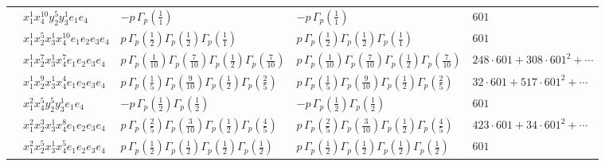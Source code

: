 \documentclass[11pt]{article}
\begin{document}
\begin{table}[ht]
{\begin{tabular}{@{}lllll@{}}
 & $x_{1}^{1} x_{4}^{10} y_{2}^{5} y_{3}^{1} e_{1} e_{4}$ & $- p \, \Gamma_p \left( \frac{1}{1} \right)$ & $- p \, \Gamma_p \left( \frac{1}{1} \right)$ & $601$ \\
 & $x_{1}^{1} x_{2}^{5} x_{3}^{1} x_{4}^{10}  e_{1} e_{2} e_{3} e_{4}$ & $p \, \Gamma_p \left( \frac{1}{2} \right) \Gamma_p \left( \frac{1}{2} \right) \Gamma_p \left( \frac{1}{1} \right)$ & $p \, \Gamma_p \left( \frac{1}{2} \right) \Gamma_p \left( \frac{1}{2} \right) \Gamma_p \left( \frac{1}{1} \right)$ & $601$ \\
 & $x_{1}^{1} x_{2}^{7} x_{3}^{1} x_{4}^{7}  e_{1} e_{2} e_{3} e_{4}$ & $p \, \Gamma_p \left( \frac{1}{10} \right) \Gamma_p \left( \frac{7}{10} \right) \Gamma_p \left( \frac{1}{2} \right) \Gamma_p \left( \frac{7}{10} \right)$ & $p \, \Gamma_p \left( \frac{1}{10} \right) \Gamma_p \left( \frac{7}{10} \right) \Gamma_p \left( \frac{1}{2} \right) \Gamma_p \left( \frac{7}{10} \right)$ & $248{\cdot}601{+}308{\cdot}601^{2}{+}\cdots$ \\
 & $x_{1}^{1} x_{2}^{9} x_{3}^{1} x_{4}^{4}  e_{1} e_{2} e_{3} e_{4}$ & $p \, \Gamma_p \left( \frac{1}{5} \right) \Gamma_p \left( \frac{9}{10} \right) \Gamma_p \left( \frac{1}{2} \right) \Gamma_p \left( \frac{2}{5} \right)$ & $p \, \Gamma_p \left( \frac{1}{5} \right) \Gamma_p \left( \frac{9}{10} \right) \Gamma_p \left( \frac{1}{2} \right) \Gamma_p \left( \frac{2}{5} \right)$ & $32{\cdot}601{+}517{\cdot}601^{2}{+}\cdots$ \\
 & $x_{1}^{2} x_{4}^{5} y_{2}^{5} y_{3}^{1} e_{1} e_{4}$ & $- p \, \Gamma_p \left( \frac{1}{2} \right) \Gamma_p \left( \frac{1}{2} \right)$ & $- p \, \Gamma_p \left( \frac{1}{2} \right) \Gamma_p \left( \frac{1}{2} \right)$ & $601$ \\
 & $x_{1}^{2} x_{2}^{3} x_{3}^{1} x_{4}^{8}  e_{1} e_{2} e_{3} e_{4}$ & $p \, \Gamma_p \left( \frac{2}{5} \right) \Gamma_p \left( \frac{3}{10} \right) \Gamma_p \left( \frac{1}{2} \right) \Gamma_p \left( \frac{4}{5} \right)$ & $p \, \Gamma_p \left( \frac{2}{5} \right) \Gamma_p \left( \frac{3}{10} \right) \Gamma_p \left( \frac{1}{2} \right) \Gamma_p \left( \frac{4}{5} \right)$ & $423{\cdot}601{+}34{\cdot}601^{2}{+}\cdots$ \\
 & $x_{1}^{2} x_{2}^{5} x_{3}^{1} x_{4}^{5}  e_{1} e_{2} e_{3} e_{4}$ & $p \, \Gamma_p \left( \frac{1}{2} \right) \Gamma_p \left( \frac{1}{2} \right) \Gamma_p \left( \frac{1}{2} \right) \Gamma_p \left( \frac{1}{2} \right)$ & $p \, \Gamma_p \left( \frac{1}{2} \right) \Gamma_p \left( \frac{1}{2} \right) \Gamma_p \left( \frac{1}{2} \right) \Gamma_p \left( \frac{1}{2} \right)$ & $601$ \\

\end{tabular}}
\end{table}
\end{document}

